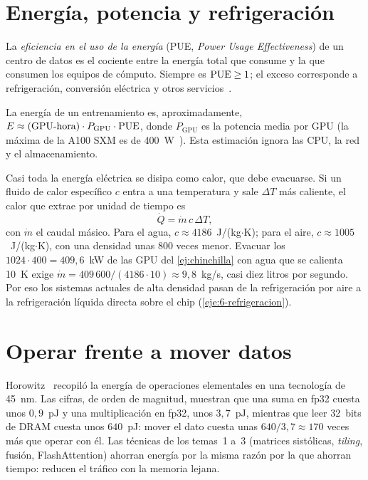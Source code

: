 \section{Energía, potencia y refrigeración}

\begin{definicion}[PUE]
La \emph{eficiencia en el uso de la energía} (PUE, \emph{Power Usage Effectiveness}) de un centro de datos es el cociente entre la energía total que consume y la que consumen los equipos de cómputo. Siempre es $\mathrm{PUE}\ge 1$; el exceso corresponde a refrigeración, conversión eléctrica y otros servicios~\cite[cap.~6]{hp}.
\end{definicion}

La energía de un entrenamiento es, aproximadamente, $E\approx(\text{GPU-hora})\cdot P_{\mathrm{GPU}}\cdot\mathrm{PUE}$, donde $P_{\mathrm{GPU}}$ es la potencia media por GPU (la máxima de la A100 SXM es de 400~W~\cite{a100}). Esta estimación ignora las CPU, la red y el almacenamiento.

Casi toda la energía eléctrica se disipa como calor, que debe evacuarse. Si un fluido de calor específico $c$ entra a una temperatura y sale $\Delta T$ más caliente, el calor que extrae por unidad de tiempo es
\[
\dot{Q}=\dot{m}\,c\,\Delta T,
\]
con $\dot{m}$ el caudal másico. Para el agua, $c\approx 4186$~J/(kg$\cdot$K); para el aire, $c\approx 1005$~J/(kg$\cdot$K), con una densidad unas 800 veces menor. Evacuar los $1024\cdot 400=409{,}6$~kW de las GPU del \cref{ej:chinchilla} con agua que se calienta 10~K exige $\dot{m}=409\,600/(4186\cdot 10)\approx 9{,}8$~kg/s, casi diez litros por segundo. Por eso los sistemas actuales de alta densidad pasan de la refrigeración por aire a la refrigeración líquida directa sobre el chip (\cref{eje:6-refrigeracion}).

\section{Operar frente a mover datos}

Horowitz~\cite{horowitz} recopiló la energía de operaciones elementales en una tecnología de 45~nm. Las cifras, de orden de magnitud, muestran que una suma en fp32 cuesta unos $0{,}9$~pJ y una multiplicación en fp32, unos $3{,}7$~pJ, mientras que leer 32~bits de DRAM cuesta unos $640$~pJ: mover el dato cuesta unas $640/3{,}7\approx 170$ veces más que operar con él. Las técnicas de los temas~1 a~3 (matrices sistólicas, \emph{tiling}, fusión, FlashAttention) ahorran energía por la misma razón por la que ahorran tiempo: reducen el tráfico con la memoria lejana.

